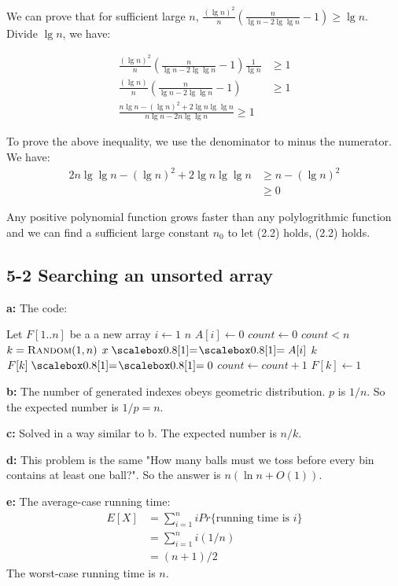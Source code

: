 \documentclass{book}
\begin{document}
\begin{CJK}{UTF8}{gkai}
We can prove that for sufficient large $n$, $\frac{(\lg n)^2}{n} (\frac{n}{\lg n - 2\lg \lg n} - 1) \ge \lg n$. Divide 
$\lg n$, we have:

\begin{align*}
\frac{(\lg n)^2}{n} (\frac{n}{\lg n - 2\lg \lg n} - 1) \frac{1}{\lg n} & \ge 1 \\
\frac{(\lg n)}{n} (\frac{n}{\lg n - 2\lg \lg n} - 1) & \ge 1\\
\frac{n\lg n - (\lg n)^2 + 2 \lg n\lg \lg n}{n\lg n - 2n\lg\lg n} \ge 1
\end{align*}

To prove the above inequality, we use the denominator to minus the numerator. We have:
\begin{align}
2n\lg\lg n - (\lg n)^2 + 2\lg n \lg\lg n & \ge n - (\lg n)^2 \\
 & \ge 0
\end{align}

Any positive polynomial function grows faster than any polylogrithmic function 
and we can find a sufficient large constant $n_0$ to let (2.2) holds, (2.2) 
holds.

\subsection*{5-2 Searching an unsorted array}
\textbf{a:} The code:
\begin{codebox}
\li Let $F[1..n]$ be a a new array
\li \For $i \gets 1$ \To $n$
\li \Do $A[i] \gets 0$
\End
\li $count \gets 0$
\li \While $count < n$
\Do \li $k = \textnormal{\scshape Random}(1, n)$
\li \If $x \isequal A[i]$
\li \Then \Return $k$
\End
\li \If $F[k] \isequal 0$
\li \Then $count \gets count + 1$
\li $F[k] \gets 1$
\End
\End
\end{codebox}

\textbf{b:} The number of generated indexes obeys geometric distribution. $p$ is 
$1/n$. So the expected number is $1/p=n$.

\textbf{c:} Solved in a way similar to b. The expected number is $n/k$.

\textbf{d:} This problem is the same "How many balls must we toss before every 
bin contains at least one ball?". So the answer is $n(\ln n + O(1)) 
$.

\textbf{e:} The average-case running time:
\begin{align*}
E[X] & = \sum_{i = 1}^{n} i Pr\{\text{running time is $i$}\}\\
& = \sum_{i = 1}^{n} i (1/n) \\
& = (n+1)/2
\end{align*}
The worst-case running time is $n$.


\end{CJK}
\end{document}
